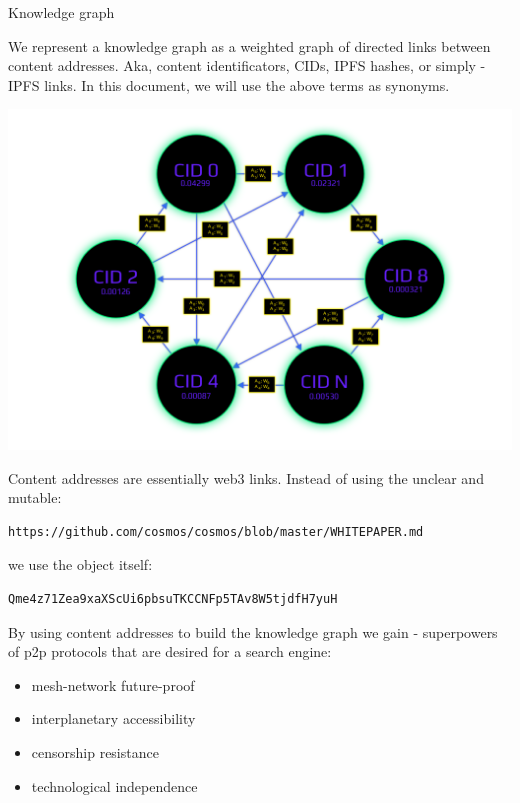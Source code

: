 \documentclass[8pt,oneside]{amsart}
\makeatletter
\newcommand{\linkred}[2]{\href{#1}{\color{red}{#2}}}
\newcommand{\linkgreen}[2]{\href{#1}{\color{green}{#2}}}
\renewcommand\subsection{\@startsection{subsection}
                                    {2}{\z@}
                                    {-3.25ex\@plus -1ex \@minus -.2ex}
                                    {0ex \@plus .2ex}
                                    {\play\Large}
                        }
\newcommand{\titleSection}[1]{\subsection{#1}}
\newenvironment{Figure}
  {\par\medskip\noindent\minipage{\linewidth}}
  {\endminipage\par\medskip}
\makeatother
\begin{document}
\titleSection{Knowledge graph}\label{knowledge-graph}

We represent a knowledge graph as a weighted graph of directed links between content addresses. Aka, content identificators, CIDs, IPFS hashes, or simply - IPFS links. In this document, we will use the above terms as synonyms.

\begin{Figure}
    \centering
    \includegraphics[width=1\textwidth]{knowledge-graph.png}
\end{Figure}

Content addresses are essentially web3 links. Instead of using the unclear and mutable:
\begin{lstlisting}
https://github.com/cosmos/cosmos/blob/master/WHITEPAPER.md
\end{lstlisting}
we use the object itself:
\begin{lstlisting}
Qme4z71Zea9xaXScUi6pbsuTKCCNFp5TAv8W5tjdfH7yuH
\end{lstlisting}

By using content addresses to build the knowledge graph we gain \linkred{https://steemit.com/web3/@hipster/an-idea-of-decentralized-search-for-web3-ce860d61defe5est}{the so much needed} \linkgreen{https://ipfs.io/ipfs/QmV9tSDx9UiPeWExXEeH6aoDvmihvx6jD5eLb4jbTaKGps}{IPFS} - \linkgreen{https://ipfs.io/ipfs/QmXHGmfo4sjdHVW2MAxczAfs44RCpSeva2an4QvkzqYgfR}{like} superpowers of p2p protocols that are desired for a search engine:

\begin{itemize}
\item mesh-network future-proof
\item interplanetary accessibility
\item censorship resistance
\item technological independence
\end{itemize}
\end{document}
